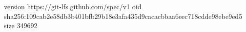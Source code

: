 version https://git-lfs.github.com/spec/v1
oid sha256:109cab2e58db3b401bfb29b18e3afa435d9cacacbbaa6eec718cdde98ebe9ed5
size 349692
